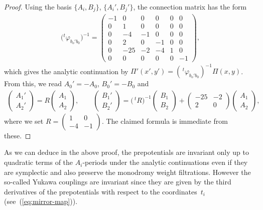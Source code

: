 \documentclass[10pt,a4paper]{amsart}
\numberwithin{equation}{section}
\begin{document}
\begin{proof}Using the basis $\{ A_{i},B_{j}\} $, $\{ A_{i}',B_{j}'\} $, the connection matrix has the form
\begin{gather*}
\big({}^{t}\varphi_{b_{o}'b_{0}}\big)^{-1}=\left(\begin{smallmatrix}-1 & 0 & 0 & 0 & 0 & 0\\
0 & 1 & 0 & 0 & 0 & 0\\
0 & -4 & -1 & 0 & 0 & 0\\
0 & 2 & 0 & -1 & 0 & 0\\
0 & -25 & -2 & -4 & 1 & 0\\
0 & 0 & 0 & 0 & 0 & -1
\end{smallmatrix}\right),
\end{gather*}
which gives the analytic continuation by $\Pi'(x',y')=(\,^{t}\varphi_{b_{o}'b_{0}})^{-1}\Pi(x,y)$.
From this, we read $A_{0}'=-A_{0}$, $B_{0}'=-B_{0}$ and
\begin{gather*}
\left(\begin{smallmatrix}A_{1}'\\
A_{2}'
\end{smallmatrix}\right)=R\left(\begin{smallmatrix}A_{1}\\
A_{2}
\end{smallmatrix}\right),\qquad \left(\begin{smallmatrix}B_{1}'\\
B_{2}'
\end{smallmatrix}\right)=\big(\,^{t}R\big)^{-1}\left(\begin{smallmatrix}B_{1}\\
B_{2}
\end{smallmatrix}\right)+\left(\begin{smallmatrix}-25 & -2\\
2 & 0
\end{smallmatrix}\right)\left(\begin{smallmatrix}A_{1}\\
A_{2}
\end{smallmatrix}\right),
\end{gather*}
where we set $R=\left(\begin{smallmatrix}1 & 0\\
-4 & -1
\end{smallmatrix}\right)$. The claimed formula is immediate from these.
\end{proof}

As we can deduce in the above proof, the prepotentials are invariant only up to quadratic terms of the $A_{i}$-periods under the analytic continuations even if they are symplectic and also preserve the monodromy weight filtrations. However the so-called Yukawa couplings are invariant since they are given by the third derivatives of the prepotentials with respect to the coordinates~$t_{i}$ (see~(\ref{eq:mirror-map})).
\end{document}
